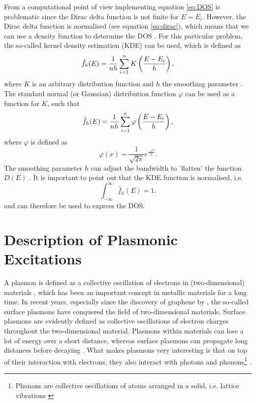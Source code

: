From a computational point of view implementing equation \ref{eq:DOS} is problematic since the Dirac delta function is not finite for $E=E_i$. However, the Dirac delta function is normalised (see equation \ref{eq:dirac}), which means that we can use a density function to determine the DOS \cite{Griffiths2018}. For this particular problem, the so-called kernel density estimation (KDE) can be used, which is defined as
\begin{equation}
    \hat{f}_h(E) = \frac{1}{nh}\sum_{i=1}^nK\left(\frac{E-E_i}{h}\right),
\end{equation}
where $K$ is an arbitrary distribution function and $h$ the smoothing parameter \cite{kde}. The standard normal (or Gaussian) distribution function $\varphi$ can be used as a function for $K$, such that
\begin{equation}
    \hat{f}_h(E) = \frac{1}{nh}\sum_{i=1}^n\varphi\left(\frac{E-E_i}{h}\right),
\end{equation}
where $\varphi$ is defined as \cite{Bronshtein2015}
\begin{equation}
    \varphi(x)=\frac{1}{\sqrt{2\pi}}e^{\frac{-x^2}{2}}.
\end{equation}
The smoothing parameter $h$ can adjust the bandwidth to 'flatten' the function $D(E)$ \cite{kde}. It is important to point out that the KDE function is normalised, i.e.
\begin{equation}
    \int_{-\infty}^\infty \hat{f}_h(E) = 1.
\end{equation}
and can therefore be used to express the DOS.


\section{Description of Plasmonic Excitations}\label{theory_plasmons_coul}

A plasmon is defined as a collective oscillation of electrons in (two-dimensional) materials \cite{Bao2017}, which has been an important concept in metallic materials for a long time. In recent years, especially since the discovery of graphene by \textcite{Novoselov2004}, the so-called surface plasmons have conquered the field of two-dimensional materials. Surface plasmons are evidently defined as collective oscillations of electron charges throughout the two-dimensional material. Plasmons within materials can lose a lot of energy over a short distance, whereas surface plasmons can propagate long distances before decaying \cite{Bao2017}. What makes plasmons very interesting is that on top of their interaction with electrons, they also interact with photons and phonons\footnote{Phonons are collective oscillations of atoms arranged in a solid, i.e. lattice vibrations \cite{Patterson2007}} \cite{Bao2017}.

